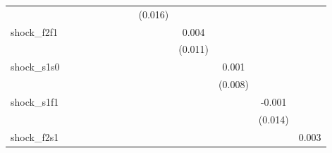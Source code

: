 {\begin{tabular}{l*{12}{c}}
            &                     &                     &                     &                     &                     &                     &                     &     (0.016)         &                     &                     &                     &                     \\
\addlinespace
shock\_f2f1  &                     &                     &                     &                     &                     &                     &                     &                     &       0.004         &                     &                     &                     \\
            &                     &                     &                     &                     &                     &                     &                     &                     &     (0.011)         &                     &                     &                     \\
\addlinespace
shock\_s1s0  &                     &                     &                     &                     &                     &                     &                     &                     &                     &       0.001         &                     &                     \\
            &                     &                     &                     &                     &                     &                     &                     &                     &                     &     (0.008)         &                     &                     \\
\addlinespace
shock\_s1f1  &                     &                     &                     &                     &                     &                     &                     &                     &                     &                     &      -0.001         &                     \\
            &                     &                     &                     &                     &                     &                     &                     &                     &                     &                     &     (0.014)         &                     \\
\addlinespace
shock\_f2s1  &                     &                     &                     &                     &                     &                     &                     &                     &                     &                     &                     &       0.003         \\

\end{tabular}}
